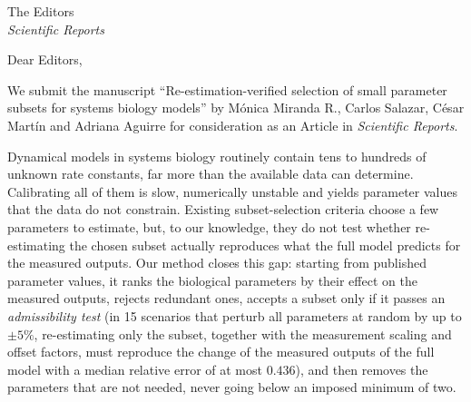 \documentclass[11pt]{letter}
\date{November 15, 2026}
\begin{document}
\begin{letter}{The Editors\\\emph{Scientific Reports}}

\opening{Dear Editors,}

We submit the manuscript ``Re-estimation-verified selection of small parameter subsets for systems biology models'' by M\'onica Miranda R., Carlos Salazar, C\'esar Mart\'in and Adriana Aguirre for consideration as an Article in \emph{Scientific Reports}.

Dynamical models in systems biology routinely contain tens to hundreds of unknown rate constants, far more than the available data can determine. Calibrating all of them is slow, numerically unstable and yields parameter values that the data do not constrain. Existing subset-selection criteria choose a few parameters to estimate, but, to our knowledge, they do not test whether re-estimating the chosen subset actually reproduces what the full model predicts for the measured outputs. Our method closes this gap: starting from published parameter values, it ranks the biological parameters by their effect on the measured outputs, rejects redundant ones, accepts a subset only if it passes an \emph{admissibility test} (in 15 scenarios that perturb all parameters at random by up to $\pm5\%$, re-estimating only the subset, together with the measurement scaling and offset factors, must reproduce the change of the measured outputs of the full model with a median relative error of at most $0.436$), and then removes the parameters that are not needed, never going below an imposed minimum of two.


\end{letter}
\end{document}
